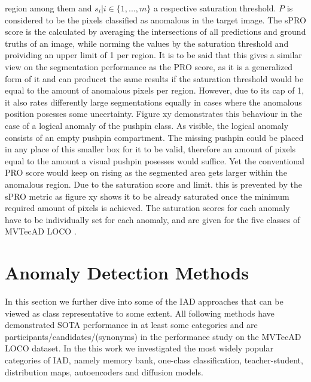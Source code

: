 region among them and $s_i | i \in \{1, ... , m\}$ a respective saturation threshold. $P$ is considered to be the pixels classified as anomalous 
in the target image. The sPRO score is the calculated by averaging the intersections of all predictions and ground truths of an image, 
while norming the values by the saturation threshold and proividing an upper limit of 1 per region. It is to be said that this gives a similar 
view on the segmentation performance as the PRO score, as it is a generalized form of it and can producet the same results if the saturation 
threshold would be equal to the amount of anomalous pixels per region. However, due to its cap of 1, it also rates differently large segmentations equally in cases 
where the anomalous position posesses some uncertainty. Figure xy demonstrates this behaviour in the case of a logical anomaly of the pushpin class. 
As visible, the logical anomaly consists of an empty pushpin compartment. The missing pushpin could be placed in any place of this smaller 
box for it to be valid, therefore an amount of pixels equal to the amount a visual pushpin posesses would suffice. Yet the conventional PRO score 
would keep on rising as the segmented area gets larger within the anomalous region. Due to the saturation score and limit. this is prevented 
by the sPRO metric as figure xy shows it to be already saturated once the minimum required amount of pixels is achieved. The saturation 
scores for each anomaly have to be individually set for each anomaly, and are given for the five classes of MVTecAD LOCO \cite{LOCODentsAndScratchesBergmann2022}.



\section{Anomaly Detection Methods}
\label{sec:IADmethods}
In this section we further dive into some of the IAD approaches that can be viewed as class representative to some extent. All following methods have demonstrated SOTA performance in 
at least some categories and are participants/candidates/(synonyms) in the performance study on the MVTecAD LOCO dataset. In the this work we investigated the most widely popular categories of 
IAD, namely memory bank, one-class classification, teacher-student, distribution maps, autoencoders and diffusion models.


